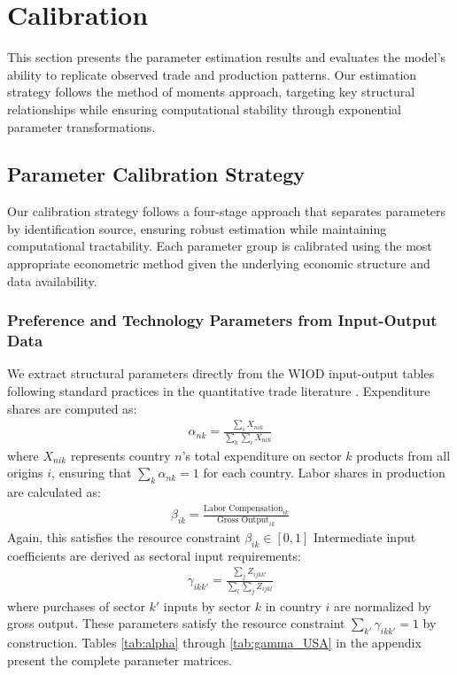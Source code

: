 \section{Calibration}

This section presents the parameter estimation results and evaluates the model's ability to replicate observed trade and production patterns. Our estimation strategy follows the method of moments approach, targeting key structural relationships while ensuring computational stability through exponential parameter transformations.

\subsection{Parameter Calibration Strategy}

Our calibration strategy follows a four-stage approach that separates parameters by identification source, ensuring robust estimation while maintaining computational tractability. Each parameter group is calibrated using the most appropriate econometric method given the underlying economic structure and data availability. 

\subsubsection{Preference and Technology Parameters from Input-Output Data}

We extract structural parameters directly from the WIOD input-output tables following standard practices in the quantitative trade literature \citep{costinot2012TheReviewofEconomicStudies}. Expenditure shares are computed as:
\begin{align*}
\alpha_{nk} = \frac{\sum_i X_{nik}}{\sum_k \sum_i X_{nik}}
\end{align*}
where $X_{nik}$ represents country $n$'s total expenditure on sector $k$ products from all origins $i$, ensuring that $\sum_k \alpha_{nk} = 1$ for each country. Labor shares in production are calculated as:
\begin{align*}
\beta_{ik} = \frac{\text{Labor Compensation}_{ik}}{\text{Gross Output}_{ik}}
\end{align*}
Again, this satisfies the resource constraint $\beta_{ik} \in [0,1]$ Intermediate input coefficients are derived as sectoral input requirements:
\begin{align*}
\gamma_{ikk'} = \frac{\sum_j Z_{ijkk'}}{\sum_{l}\sum_j Z_{ijkl}}
\end{align*}
where purchases of sector $k'$ inputs by sector $k$ in country $i$ are normalized by gross output. These parameters satisfy the resource constraint $\sum_{k'} \gamma_{ikk'} = 1$ by construction. Tables \ref{tab:alpha} through \ref{tab:gamma_USA} in the appendix present the complete parameter matrices.

